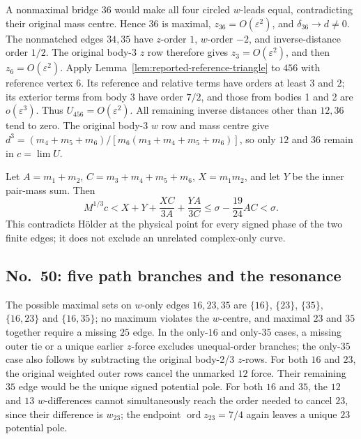 \documentclass[11pt]{amsart}
\theoremstyle{remark}
\newcommand{\ord}{\operatorname{ord}}
\begin{document}
A nonmaximal bridge $36$ would make all four circled $w$-leads equal, contradicting their original mass centre. Hence $36$ is maximal, $z_{36}=O(\varepsilon^2)$, and $\delta_{36}\to d\ne0$. The nonmatched edges $34,35$ have $z$-order $1$, $w$-order $-2$, and inverse-distance order $1/2$. The original body-3 $z$ row therefore gives $z_3=O(\varepsilon^2)$, and then $z_6=O(\varepsilon^2)$. Apply Lemma~\ref{lem:reported-reference-triangle} to $456$ with reference vertex 6. Its reference and relative terms have orders at least $3$ and $2$; its exterior terms from body 3 have order $7/2$, and those from bodies 1 and 2 are $o(\varepsilon^3)$. Thus $U_{456}=O(\varepsilon^2)$. All remaining inverse distances other than $12,36$ tend to zero. The original body-3 $w$ row and mass centre give $d^3=(m_4+m_5+m_6)/[m_6(m_3+m_4+m_5+m_6)]$, so only $12$ and $36$ remain in $c=\lim U$.

Let $A=m_1+m_2$, $C=m_3+m_4+m_5+m_6$, $X=m_1m_2$, and let $Y$ be the inner pair-mass sum. Then
\begin{equation}\label{eq:no31-holder-gap}
M^{1/3}c<X+Y+\frac{XC}{3A}+\frac{YA}{3C}\le\sigma-\frac{19}{24}AC<\sigma.
\end{equation}
This contradicts H\"older at the physical point for every signed phase of the two finite edges; it does not exclude an unrelated complex-only curve.

\subsection{No.~50: five path branches and the resonance}\label{sec:no50-resonance}
The possible maximal sets on $w$-only edges $16,23,35$ are $\{16\}$, $\{23\}$, $\{35\}$, $\{16,23\}$ and $\{16,35\}$; no maximum violates the $w$-centre, and maximal $23$ and $35$ together require a missing $25$ edge. In the only-$16$ and only-$35$ cases, a missing outer tie or a unique earlier $z$-force excludes unequal-order branches; the only-$35$ case also follows by subtracting the original body-2/3 $z$-rows. For both $16$ and $23$, the original weighted outer rows cancel the unmarked $12$ force. Their remaining $35$ edge would be the unique signed potential pole. For both $16$ and $35$, the $12$ and $13$ $w$-differences cannot simultaneously reach the order needed to cancel $23$, since their difference is $w_{23}$; the endpoint $\ord z_{23}=7/4$ again leaves a unique $23$ potential pole.
\end{document}
